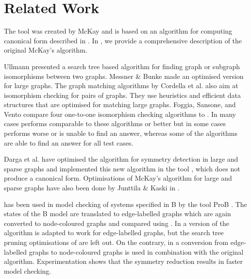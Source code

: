 \section{Related Work}
\label{section-related-work}

The \NAUTY tool was created by McKay \cite{mckay2008:nauty24} and is based on
an algorithm for computing canonical form described in
\cite{mckay1981:practical}. In \cite{kant2010:canonical}, we provide a
comprehensive description of the original McKay's algorithm.

Ullmann \cite{ullmann1976:algorithm} presented a search tree based algorithm for
finding graph or subgraph isomorphisms between two graphs. Messner \& Bunke
\cite{messmer1999:decision,messmer2000:efficient} made an optimised version for
large graphs. The graph matching algorithms by Cordella et al.
\cite{cordella1999:performance,cordella2001:improved,cordella2004:subgraph} also
aim at isomorphism checking for pairs of graphs. They use heuristics and
efficient data structures that are optimised for matching large graphs.
Foggia, Sansone, and Vento compare four one-to-one isomorphism checking
algorithms to \NAUTY \cite{foggia2001:performance}. In many cases \NAUTY
performs comparable to these algorithms or better but in some cases \NAUTY
performs worse or is unable to find an answer, whereas some of the algorithms
are able to find an answer for all test cases.

Darga et al. \cite{darga2008:faster} have optimised the \NAUTY algorithm
for symmetry detection in large and sparse graphs and implemented this new
algorithm in the tool \SAUCY \cite{darga2008:saucy}, which does not produce a
canonical form. Optimisations of McKay's algorithm for large and sparse graphs
have also been done by Junttila \& Kaski \cite{junttila2007:engineering} in
\BLISS \cite{junttila2008:bliss}.

\NAUTY has been used in model checking of systems specified in B by the tool
ProB \cite{turner2007:symmetry,spermann2008:prob}. The states of the B model are
translated to edge-labelled graphs which are again converted to node-coloured
graphs and compared using \NAUTY. In \cite{turner2007:symmetry} a version of the
\NAUTY algorithm is adapted to work for edge-labelled graphs, but the search
tree pruning optimisations of \NAUTY are left out. On the contrary, in
\cite{spermann2008:prob} a conversion from edge-labelled graphs to node-coloured
graphs is used in combination with the original \NAUTY algorithm.
Experimentation shows that the symmetry reduction results in faster model
checking.

